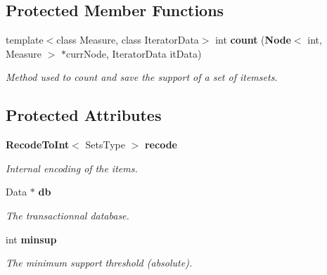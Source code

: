 \subsection*{Protected Member Functions}
\begin{CompactItemize}
\item 
template$<$class Measure, class Iterator\-Data$>$ int {\bf count} ({\bf Node}$<$ int, Measure $>$ $\ast$curr\-Node, Iterator\-Data it\-Data)
\begin{CompactList}\small\item\em Method used to count and save the support of a set of itemsets. \item\end{CompactList}\end{CompactItemize}
\subsection*{Protected Attributes}
\begin{CompactItemize}
\item 
{\bf Recode\-To\-Int}$<$ Sets\-Type $>$ {\bf recode}\label{class_frequent_3f48fefd58b3b8f45fcd4e5cc4d48931}

\begin{CompactList}\small\item\em Internal encoding of the items. \item\end{CompactList}\item 
Data $\ast$ {\bf db}\label{class_frequent_ff67dcf2a726388189b0ff9a27ef6618}

\begin{CompactList}\small\item\em The transactionnal database. \item\end{CompactList}\item 
int {\bf minsup}\label{class_frequent_23ababafb524d4f848d5e299ca2ff372}

\begin{CompactList}\small\item\em The minimum support threshold (absolute). \item\end{CompactList}\end{CompactItemize}
